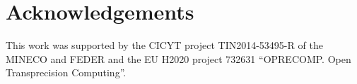 \section*{Acknowledgements}
This work was supported by the CICYT project TIN2014-53495-R of the MINECO and
FEDER and the EU H2020 project 732631
``OPRECOMP. Open Transprecision Computing''.
